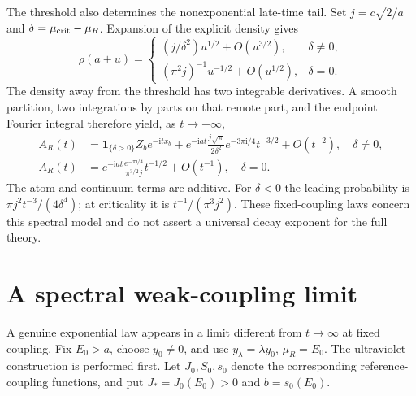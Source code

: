 \documentclass[11pt,a4paper,oneside]{book}
\theoremstyle{plain}
\theoremstyle{definition}
\theoremstyle{remark}
\newcommand{\ii}{\mathrm i}
\newcommand{\src}[2]{\cite{#1}}
\begin{document}
The threshold also determines the nonexponential late-time tail.  Set
$j=c\sqrt{2/a}$ and $\delta=\mu_{\rm crit}-\mu_R$.  Expansion of the
explicit density gives
\begin{equation}
 \rho(a+u)=
 \begin{cases}
 (j/\delta^2)u^{1/2}+O(u^{3/2}),&\delta\ne0,\\
 (\pi^2j)^{-1}u^{-1/2}+O(u^{1/2}),&\delta=0.
 \end{cases}
 \label{eq:parent-threshold-density}
\end{equation}
The density away from the threshold has two integrable derivatives.
A smooth partition, two integrations by parts on that remote part,
and the endpoint Fourier integral therefore yield, as $t\to+\infty$,
\begin{equation}
 \begin{split}
 A_R(t)&=\mathbf1_{\{\delta>0\}}Z_be^{-\ii tx_b}
 +e^{-\ii at}\frac{j\sqrt\pi}{2\delta^2}
          e^{-3\pi\ii/4}t^{-3/2}+O(t^{-2}),\quad\delta\ne0,\\
 A_R(t)&=e^{-\ii at}\frac{e^{-\pi\ii/4}}{\pi^{3/2}j}
                       t^{-1/2}+O(t^{-1}),\quad\delta=0.
 \end{split}
 \label{eq:parent-threshold-tails}
\end{equation}
The atom and continuum terms are additive.  For $\delta<0$ the leading
probability is $\pi j^2t^{-3}/(4\delta^4)$; at criticality it is
$t^{-1}/(\pi^3j^2)$.  These fixed-coupling laws concern this spectral
model and do not assert a universal decay exponent for the full theory.
\src{R20}{thm:v20v49-density,thm:v20v49-tails}

\section{A spectral weak-coupling limit}
\label{sec:parent-weak-coupling}
A genuine exponential law appears in a limit different from
$t\to\infty$ at fixed coupling.  Fix $E_0>a$, choose $y_0\ne0$, and
use $y_\lambda=\lambda y_0$, $\mu_R=E_0$.  The ultraviolet construction
is performed first.  Let $J_0,S_0,s_0$ denote the corresponding
reference-coupling functions, and put $J_*=J_0(E_0)>0$ and
$b=s_0(E_0)$.
\end{document}
